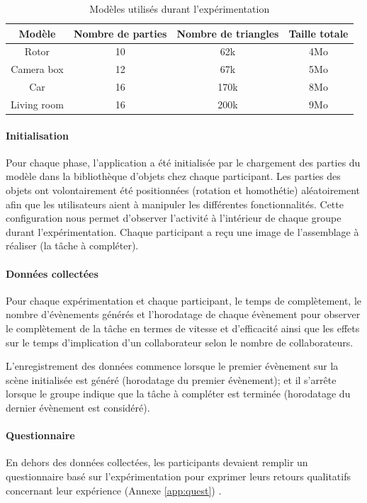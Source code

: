 \begin{table}[ht]
	\centering
	\caption{Modèles utilisés durant l'expérimentation}
	\label{table:summary}
	\begin{tabular}{cccc}\hline
		\textbf{Modèle}  & \textbf{Nombre de parties} &  \textbf{Nombre de triangles} 
		& \textbf{Taille totale}  \\ \hline
		Rotor      &   10  &    62k & 4Mo        \\
		Camera box        &   12  &    67k & 5Mo        \\
		Car      &   16  &      170k & 8Mo \\       
		Living room      &   16  &      200k & 9Mo \\    \bottomrule
	\end{tabular}
\end{table}
\paragraph{Initialisation}

Pour chaque phase, l'application a été initialisée par le chargement des parties du 
modèle dans la bibliothèque d'objets chez chaque participant. Les parties des 
objets ont volontairement été positionnées (rotation et homothétie) aléatoirement 
afin que les utilisateurs aient à manipuler les différentes fonctionnalités. Cette 
configuration nous permet d'observer l'activité à l'intérieur de chaque groupe durant 
l'expérimentation. Chaque participant a reçu une image de l'assemblage à réaliser 
(la tâche à compléter). 

\paragraph{Données collectées}
Pour chaque expérimentation et chaque participant, le temps de complètement, le 
nombre d'évènements générés et l'horodatage de chaque évènement pour 
observer le complètement de la tâche en termes de vitesse et d'efficacité ainsi 
que les effets sur le temps d'implication d'un collaborateur selon le nombre de 
collaborateurs. 

L'enregistrement des données commence lorsque le premier évènement sur la 
scène initialisée est généré (horodatage du premier évènement); et il s'arrête 
lorsque le groupe indique que la tâche à compléter est terminée (horodatage du 
dernier évènement est considéré).


\paragraph{Questionnaire}
En dehors des données collectées, les participants devaient remplir un 
questionnaire basé sur l'expérimentation pour exprimer leurs retours qualitatifs 
concernant leur expérience (Annexe \ref{app:quest}) . 

